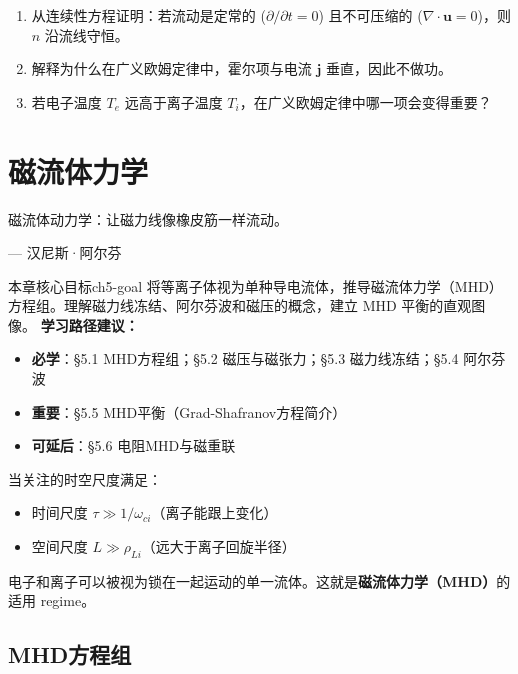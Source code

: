 \documentclass[12pt,a4paper,openany,oneside]{book}
\newcommand{\vect}[1]{\bm{#1}}
\newcommand{\divg}{\nabla\cdot}
\newcommand{\difficulty}[1]{\marginnote{\textcolor{red}{\textbf{[#1]}}}}
\begin{document}
\begin{miniquiz}
\begin{enumerate}
\item 从连续性方程证明：若流动是定常的 ($\partial/\partial t = 0$) 且不可压缩的 ($\divg\vect{u}=0$)，则 $n$ 沿流线守恒。
\item 解释为什么在广义欧姆定律中，霍尔项与电流 $\vect{j}$ 垂直，因此不做功。
\item 若电子温度 $T_e$ 远高于离子温度 $T_i$，在广义欧姆定律中哪一项会变得重要？
\end{enumerate}
\end{miniquiz}


\chapter{磁流体力学}
\epigraph{磁流体动力学：让磁力线像橡皮筋一样流动。}{--- 汉尼斯·阿尔芬}

\begin{insight}{本章核心目标}{ch5-goal}
将等离子体视为单种导电流体，推导磁流体力学（MHD）方程组。理解磁力线冻结、阿尔芬波和磁压的概念，建立 MHD 平衡的直观图像。
\tcblower
\textbf{学习路径建议：}

\begin{itemize}[leftmargin=*]
\item[\textcolor{red}{$\blacksquare$}] \textbf{必学}：\S5.1 MHD方程组；\S5.2 磁压与磁张力；\S5.3 磁力线冻结；\S5.4 阿尔芬波
\item[\textcolor{orange}{$\blacksquare$}] \textbf{重要}：\S5.5 MHD平衡（Grad-Shafranov方程简介）
\item[\textcolor{green}{$\blacksquare$}] \textbf{可延后}：\S5.6 电阻MHD与磁重联
\end{itemize}
\end{insight}

当关注的时空尺度满足：
\begin{itemize}
\item 时间尺度 $\tau \gg 1/\omega_{ci}$（离子能跟上变化）
\item 空间尺度 $L \gg \rho_{Li}$（远大于离子回旋半径）
\end{itemize}
电子和离子可以被视为锁在一起运动的单一流体。这就是\textbf{磁流体力学（MHD）}的适用 regime。

\section{MHD方程组}\difficulty{基础}
\end{document}

